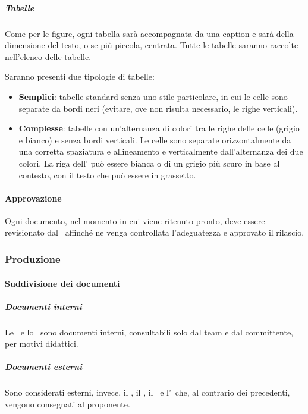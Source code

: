 			\subparagraph{Tabelle}\label{StrumentiDiSupportoTabelle}
			Come per le figure, ogni tabella sarà accompagnata da una caption e sarà della dimensione del testo, o se più piccola, centrata.
			Tutte le tabelle saranno raccolte nell'elenco delle tabelle.\par
			Saranno presenti due tipologie di tabelle:
			\begin{itemize}
				\item \textbf{Semplici}: tabelle standard senza uno stile particolare, in cui le celle sono separate da bordi neri (evitare, ove non risulta necessario,
					le righe verticali).
				\item \textbf{Complesse}: tabelle con un'alternanza di colori tra le righe delle celle (grigio e bianco) e senza bordi verticali.
					Le celle sono separate orizzontalmente da una corretta spaziatura e allineamento e verticalmente dall'alternanza dei due colori.
					La riga dell' può essere bianca o di un grigio più scuro in base al contesto, con il testo che può essere in grassetto.
			\end{itemize}

			\paragraph{Approvazione}	\label{Approvazione}
			Ogni documento, nel momento in cui viene ritenuto pronto, deve essere revisionato dal \Res\ affinché ne venga controllata l'adeguatezza e approvato il rilascio.


		\subsubsection{Produzione}

			\paragraph{Suddivisione dei documenti}\label{SuddivisioneDeiDocumenti}

			\subparagraph{Documenti interni}
			Le \NdPd\ e lo \SdFd\ sono documenti interni, consultabili solo dal team e dal committente, per motivi didattici.

			\subparagraph{Documenti esterni}
			Sono considerati esterni, invece, il \PdPd, il \PdQd, il \Gld\ e l'\AdRd\ che, al contrario dei precedenti, vengono consegnati al proponente.

